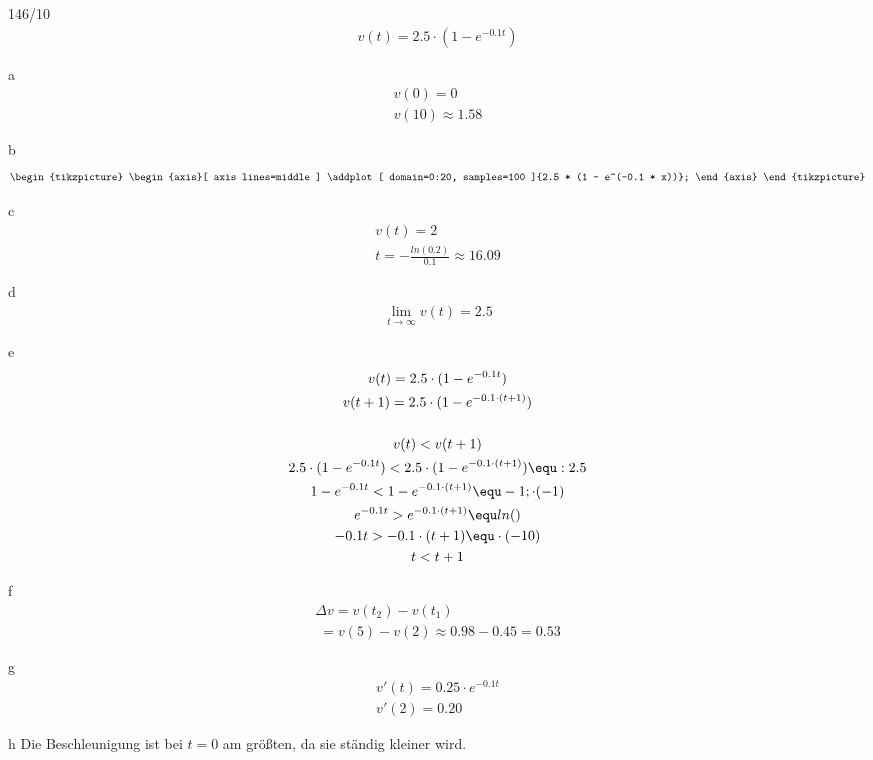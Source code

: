 \begin{exercise}{146/10}
  \begin{gather*}
    v(t) = 2.5 \cdot (1 - e^{-0.1t})
  \end{gather*}
  \item [a]
  \begin{gather*}
    v(0) = 0 \\
    v(10) \approx 1.58
  \end{gather*}
  \item [b]
  \begin{gather*}
    \begin{tikzpicture}
      \begin{axis}[
        axis lines=middle
        ]
        \addplot[
        domain=0:20,
        samples=100
        ]{2.5 * (1 - e^(-0.1 * x))};
      \end{axis}
    \end{tikzpicture}
  \end{gather*}
  \item [c]
  \begin{gather*}
    v(t) = 2 \\
    t = -\frac{ln(0.2)}{0.1} \approx 16.09
  \end{gather*}
  \item [d]
  \begin{gather*}
    \lim\limits_{t \to \infty} v(t) = 2.5
  \end{gather*}
  \item [e]
  \begin{gather*}
    v(t) = 2.5 \cdot (1 - e^{-0.1t}) \\
    v(t + 1) = 2.5 \cdot (1 - e^{-0.1 \cdot (t + 1)}) \\\\
    v(t) < v(t + 1) \\
    2.5 \cdot (1 - e^{-0.1t}) < 2.5 \cdot (1 - e^{-0.1 \cdot (t + 1)}) \equ : 2.5 \\
    1 - e^{-0.1t} < 1 - e^{-0.1 \cdot (t + 1)} \equ - 1; \cdot (-1) \\
    e^{-0.1t} > e^{-0.1 \cdot (t + 1)} \equ ln() \\
    -0.1t > -0.1 \cdot (t + 1) \equ \cdot (-10) \\
    t < t + 1
  \end{gather*}
  \item [f]
  \begin{gather*}
    \Delta v = v(t_2) - v(t_1) \\
    \;= v(5) - v(2) \approx 0.98 - 0.45 = 0.53
  \end{gather*}
  \item [g]
  \begin{gather*}
    v'(t) = 0.25 \cdot e^{-0.1t} \\
    v'(2) = 0.20
  \end{gather*}
  \item [h]
  Die Beschleunigung ist bei $t = 0$ am größten, da sie ständig kleiner wird.
\end{exercise}
